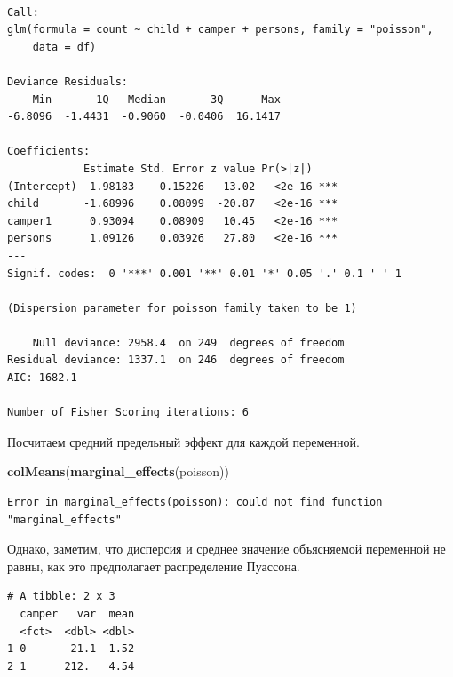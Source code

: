 \documentclass[]{book}
\newenvironment{Shaded}{\begin{snugshade}}{\end{snugshade}}
\newcommand{\DataTypeTok}[1]{\textcolor[rgb]{0.13,0.29,0.53}{#1}}
\newcommand{\KeywordTok}[1]{\textcolor[rgb]{0.13,0.29,0.53}{\textbf{#1}}}
\newcommand{\NormalTok}[1]{#1}
\newcommand{\OperatorTok}[1]{\textcolor[rgb]{0.81,0.36,0.00}{\textbf{#1}}}
\newcommand{\StringTok}[1]{\textcolor[rgb]{0.31,0.60,0.02}{#1}}
\begin{document}
\begin{verbatim}

Call:
glm(formula = count ~ child + camper + persons, family = "poisson", 
    data = df)

Deviance Residuals: 
    Min       1Q   Median       3Q      Max  
-6.8096  -1.4431  -0.9060  -0.0406  16.1417  

Coefficients:
            Estimate Std. Error z value Pr(>|z|)    
(Intercept) -1.98183    0.15226  -13.02   <2e-16 ***
child       -1.68996    0.08099  -20.87   <2e-16 ***
camper1      0.93094    0.08909   10.45   <2e-16 ***
persons      1.09126    0.03926   27.80   <2e-16 ***
---
Signif. codes:  0 '***' 0.001 '**' 0.01 '*' 0.05 '.' 0.1 ' ' 1

(Dispersion parameter for poisson family taken to be 1)

    Null deviance: 2958.4  on 249  degrees of freedom
Residual deviance: 1337.1  on 246  degrees of freedom
AIC: 1682.1

Number of Fisher Scoring iterations: 6
\end{verbatim}

Посчитаем средний предельный эффект для каждой переменной.

\begin{Shaded}
\begin{Highlighting}[]
\KeywordTok{colMeans}\NormalTok{(}\KeywordTok{marginal_effects}\NormalTok{(poisson))}
\end{Highlighting}
\end{Shaded}

\begin{verbatim}
Error in marginal_effects(poisson): could not find function "marginal_effects"
\end{verbatim}

Однако, заметим, что дисперсия и среднее значение объясняемой переменной не равны, как это предполагает распределение Пуассона.

\begin{Shaded}
\end{Shaded}

\begin{verbatim}
# A tibble: 2 x 3
  camper   var  mean
  <fct>  <dbl> <dbl>
1 0       21.1  1.52
2 1      212.   4.54
\end{verbatim}
\end{document}
